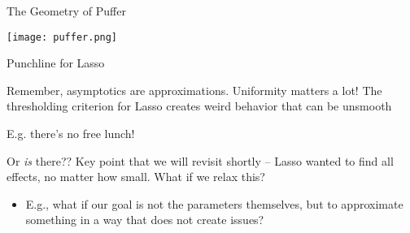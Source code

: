 \documentclass[notes,11pt, aspectratio=169]{beamer}
\newenvironment{wideitemize}{\itemize\addtolength{\itemsep}{10pt}}{\enditemize}
\begin{document}
\begin{frame}{The Geometry of Puffer}
\begin{center}
  \texttt{[image: puffer.png]}
\end{center}
\end{frame}

\begin{frame}{Punchline for Lasso}
  \begin{wideitemize}
  \item Remember, asymptotics are approximations. Uniformity matters a
    lot! The thresholding criterion for Lasso creates weird behavior
    that can be unsmooth
  \item E.g. there's no free lunch!
  \item Or \emph{is} there?? Key point that we will revisit shortly --
    Lasso wanted to find all effects, no matter how small. What if we
    relax this?
    \begin{itemize}
    \item E.g., what if our goal is not the parameters themselves, but
      to approximate something in a way that does not create issues?
    \end{itemize}
  \end{wideitemize}
\end{frame}
\end{document}

